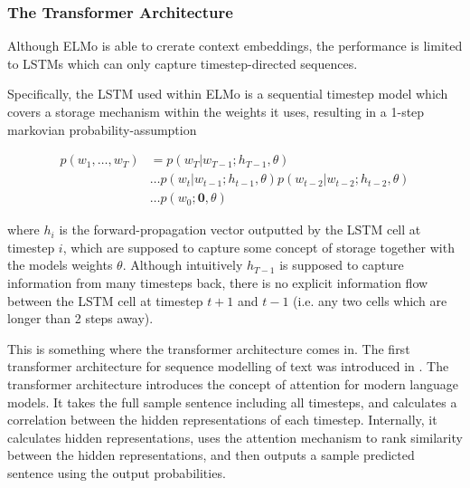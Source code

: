 \documentclass[a4paper,12pt,twoside,openright]{report}
\begin{document}

\subsubsection{The Transformer Architecture}

Although ELMo is able to crerate context embeddings, the performance is limited to LSTMs which can only capture timestep-directed sequences.

Specifically, the LSTM used within ELMo is a sequential timestep model which covers a storage mechanism within the weights it uses, resulting  in a 1-step markovian probability-assumption

\begin{align}
p(w_1, \ldots, w_T) &= p(w_T | w_{T-1}; h_{T-1}, \theta) \nonumber  \\
& \ldots p(w_t | w_{t-1}; h_{t-1}, \theta) p(w_{t-2} | w_{t-2}; h_{t-2}, \theta) \nonumber \\
& \ldots p(w_0 ; \mathbf{0}, \theta) 
\end{align}

where $h_{i}$ is the forward-propagation vector outputted by the LSTM cell at timestep $i$, which are supposed to capture some concept of storage together with the models weights $\theta$.
Although intuitively $h_{T-1}$ is supposed to capture information from many timesteps back, there is no explicit information flow between the LSTM cell at timestep $t+1$ and $t-1$ (i.e. any two cells which are longer than 2 steps away).

This is something where the transformer architecture comes in.
The first transformer architecture for sequence modelling of text was introduced in \cite{vaswani17}.
The transformer architecture introduces the concept of attention for modern language models.
It takes the full sample sentence including all timesteps, and calculates a correlation between the hidden representations of each timestep.
Internally, it calculates hidden representations, uses the attention mechanism to rank similarity between the hidden representations, and then outputs a sample predicted sentence using the output probabilities.

\end{document}
